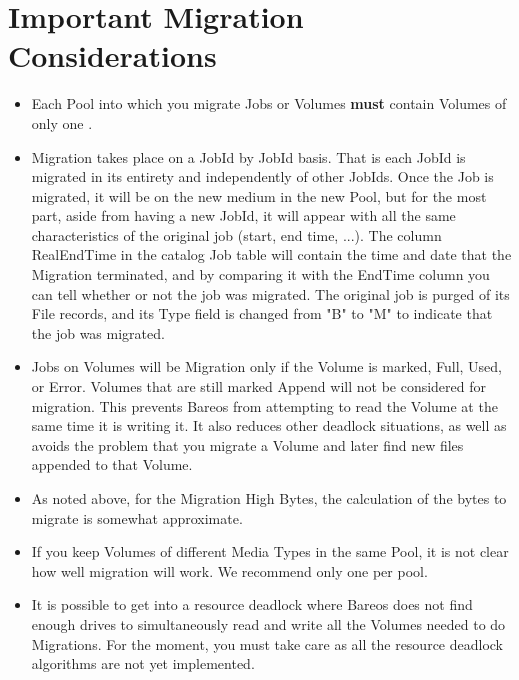 \section{Important Migration Considerations}
\begin{itemize}
\item Each Pool into which you migrate Jobs or Volumes {\bf must}
      contain Volumes of only one .

\item Migration takes place on a JobId by JobId basis. That is
      each JobId is migrated in its entirety and independently
      of other JobIds. Once the Job is migrated, it will be
      on the new medium in the new Pool, but for the most part,
      aside from having a new JobId, it will appear with all the
      same characteristics of the original job (start, end time, ...).
      The column RealEndTime in the catalog Job table will contain the
      time and date that the Migration terminated, and by comparing
      it with the EndTime column you can tell whether or not the
      job was migrated.  The original job is purged of its File
      records, and its Type field is changed from "B" to "M" to
      indicate that the job was migrated.

\item Jobs on Volumes will be Migration only if the Volume is
      marked, Full, Used, or Error.  Volumes that are still
      marked Append will not be considered for migration. This
      prevents Bareos from attempting to read the Volume at
      the same time it is writing it. It also reduces other deadlock
      situations, as well as avoids the problem that you migrate a
      Volume and later find new files appended to that Volume.

\item As noted above, for the Migration High Bytes, the calculation
      of the bytes to migrate is somewhat approximate.

\item If you keep Volumes of different Media Types in the same Pool,
      it is not clear how well migration will work.  We recommend only
      one  per pool.

\item It is possible to get into a resource deadlock where Bareos does
      not find enough drives to simultaneously read and write all the
      Volumes needed to do Migrations. For the moment, you must take
      care as all the resource deadlock algorithms are not yet implemented.


\end{itemize}
